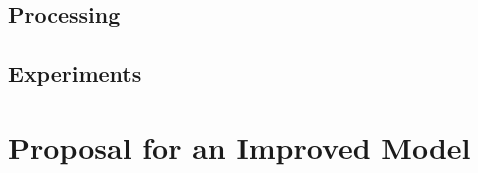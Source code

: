 \documentclass[a4paper]{article}
\begin{document}
\subsection{Processing}


\subsection{Experiments}

\section{Proposal for an Improved Model}



\end{document}

